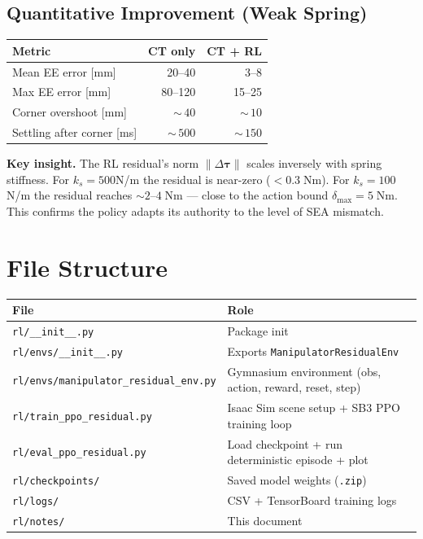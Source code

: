 \documentclass[11pt, a4paper]{article}
\newcommand{\btau}{\bm{\tau}}
\begin{document}
\subsection{Quantitative Improvement (Weak Spring)}

\begin{center}
\begin{tabular}{lrr}
\toprule
\textbf{Metric} & \textbf{CT only} & \textbf{CT + RL} \\
\midrule
Mean EE error [mm]          & 20--40  & 3--8 \\
Max EE error [mm]           & 80--120 & 15--25 \\
Corner overshoot [mm]       & ${\sim}\,40$  & ${\sim}\,10$ \\
Settling after corner [ms]  & ${\sim}\,500$ & ${\sim}\,150$ \\
\bottomrule
\end{tabular}
\end{center}

\begin{mdframed}
\textbf{Key insight.}\;
The RL residual's norm $\|\Delta\btau\|$ scales inversely with spring
stiffness.  For $k_s = 500$\;N/m the residual is near-zero
($< 0.3\;\text{Nm}$).  For $k_s = 100$\;N/m the residual reaches
$\sim 2$--$4\;\text{Nm}$ --- close to the action bound
$\delta_{\text{max}} = 5\;\text{Nm}$.  This confirms the policy
adapts its authority to the level of SEA mismatch.
\end{mdframed}


\section{File Structure}

\begin{center}
\begin{tabular}{lp{9cm}}
\toprule
\textbf{File} & \textbf{Role} \\
\midrule
\texttt{rl/\_\_init\_\_.py} & Package init \\
\texttt{rl/envs/\_\_init\_\_.py} & Exports \texttt{ManipulatorResidualEnv} \\
\texttt{rl/envs/manipulator\_residual\_env.py} & Gymnasium environment (obs, action, reward, reset, step) \\
\texttt{rl/train\_ppo\_residual.py} & Isaac Sim scene setup + SB3 PPO training loop \\
\texttt{rl/eval\_ppo\_residual.py} & Load checkpoint + run deterministic episode + plot \\
\texttt{rl/checkpoints/} & Saved model weights (\texttt{.zip}) \\
\texttt{rl/logs/} & CSV + TensorBoard training logs \\
\texttt{rl/notes/} & This document \\
\bottomrule
\end{tabular}
\end{center}
\end{document}
